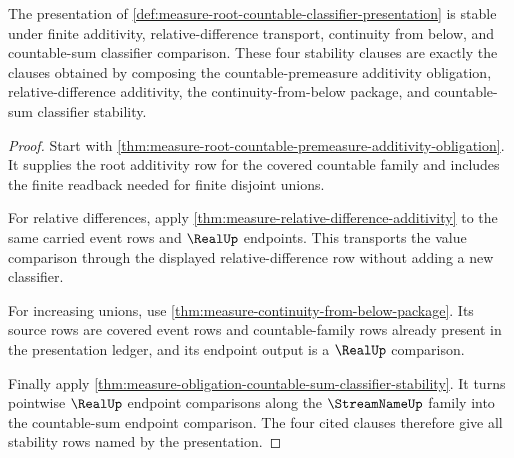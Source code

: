 \begin{theorem}
\label{thm:measure-root-countable-classifier-stability}
The presentation of
\autoref{def:measure-root-countable-classifier-presentation} is stable under
finite additivity, relative-difference transport, continuity from below, and
countable-sum classifier comparison.  These four stability clauses are exactly
the clauses obtained by composing the countable-premeasure additivity
obligation, relative-difference additivity, the continuity-from-below package,
and countable-sum classifier stability.
\end{theorem}
\begin{proof}
Start with
\autoref{thm:measure-root-countable-premeasure-additivity-obligation}.  It
supplies the root additivity row for the covered countable family and includes
the finite readback needed for finite disjoint unions.

For relative differences, apply
\autoref{thm:measure-relative-difference-additivity} to the same carried
event rows and $\RealUp$ endpoints.  This transports the value comparison
through the displayed relative-difference row without adding a new classifier.

For increasing unions, use
\autoref{thm:measure-continuity-from-below-package}.  Its source rows are
covered event rows and countable-family rows already present in the
presentation ledger, and its endpoint output is a $\RealUp$ comparison.

Finally apply
\autoref{thm:measure-obligation-countable-sum-classifier-stability}.  It turns
pointwise $\RealUp$ endpoint comparisons along the $\StreamNameUp$ family into
the countable-sum endpoint comparison.  The four cited clauses therefore give
all stability rows named by the presentation.
\end{proof}

